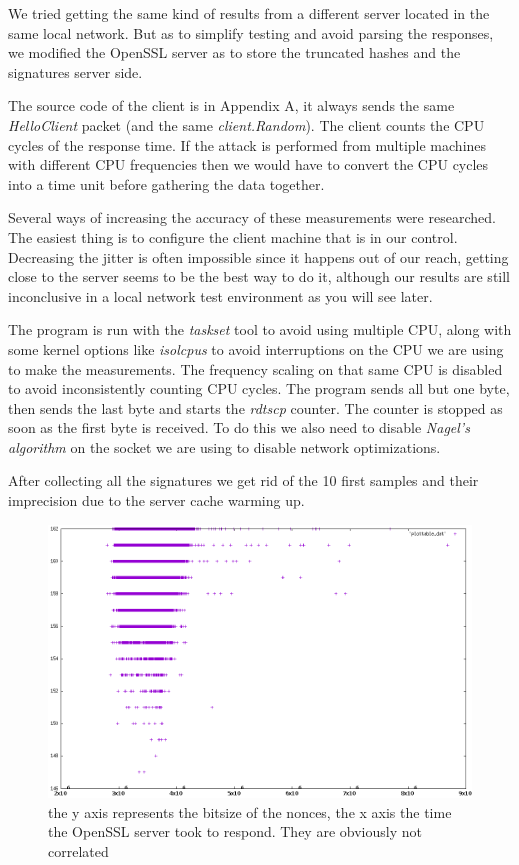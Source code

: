 \documentclass[a4paper,11pt]{article}
\begin{document}
We tried getting the same kind of results from a different server located in the same local network. But as to simplify testing and avoid parsing the responses, we modified the OpenSSL server as to store the truncated hashes and the signatures server side.

The source code of the client is in Appendix A, it always sends the same \textit{HelloClient} packet (and the same \textit{client.Random}). The client counts the CPU cycles of the response time. If the attack is performed from multiple machines with different CPU frequencies then we would have to convert the CPU cycles into a time unit before gathering the data together.

Several ways of increasing the accuracy of these measurements were researched. The easiest thing is to configure the client machine that is in our control. Decreasing the jitter is often impossible since it happens out of our reach, getting close to the server seems to be the best way to do it, although our results are still inconclusive in a local network test environment as you will see later.

The program is run with the \textit{taskset} tool to avoid using multiple CPU, along with some kernel options like \textit{isolcpus} to avoid interruptions on the CPU we are using to make the measurements. The frequency scaling on that same CPU is disabled to avoid inconsistently counting CPU cycles. The program sends all but one byte, then sends the last byte and starts the \textit{rdtscp} counter. The counter is stopped as soon as the first byte is received. To do this we also need to disable \textit{Nagel's algorithm} on the socket we are using to disable network optimizations.

After collecting all the signatures we get rid of the 10 first samples and their imprecision due to the server cache warming up.

\begin{figure}[H]
\includegraphics[width=\textwidth]{fail.png}
\caption{the y axis represents the bitsize of the nonces, the x axis the time the OpenSSL server took to respond. They are obviously not correlated}
\end{figure}
\end{document}
